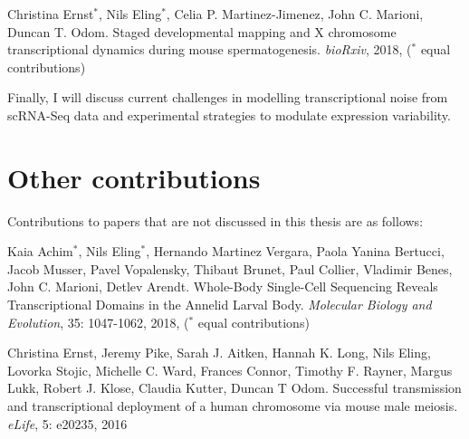 \begin{Abstract}
\hspace{-5mm} Christina Ernst$^\ast$, Nils Eling$^\ast$, Celia P. Martinez-Jimenez, John C. Marioni, Duncan T. Odom. Staged developmental mapping and X chromosome transcriptional dynamics during mouse spermatogenesis. \emph{bioRxiv}, 2018, ($^\ast$ equal contributions)
\end{Abstract}

Finally, I will discuss current challenges in modelling transcriptional noise from scRNA-Seq data and experimental strategies to modulate expression variability.

\newpage

\section{Other contributions}

Contributions to papers that are not discussed in this thesis are as follows:\\

\begin{Abstract}
\hspace{-5mm} Kaia Achim$^\ast$, Nils Eling$^\ast$, Hernando Martinez Vergara, Paola Yanina Bertucci, Jacob Musser, Pavel Vopalensky, Thibaut Brunet, Paul Collier, Vladimir Benes, John C. Marioni, Detlev Arendt. Whole-Body Single-Cell Sequencing Reveals Transcriptional Domains in the Annelid Larval Body. \emph{Molecular Biology and Evolution}, 35: 1047-1062, 2018, ($^\ast$ equal contributions)
\end{Abstract}

\begin{Abstract}
\hspace{-5mm} Christina Ernst, Jeremy Pike, Sarah J. Aitken, Hannah K. Long, Nils Eling, Lovorka Stojic, Michelle C. Ward, Frances Connor, Timothy F. Rayner, Margus Lukk, Robert J. Klose, Claudia Kutter, Duncan T Odom. Successful transmission and transcriptional deployment of a human chromosome via mouse male meiosis. \emph{eLife}, 5: e20235, 2016 
\end{Abstract}